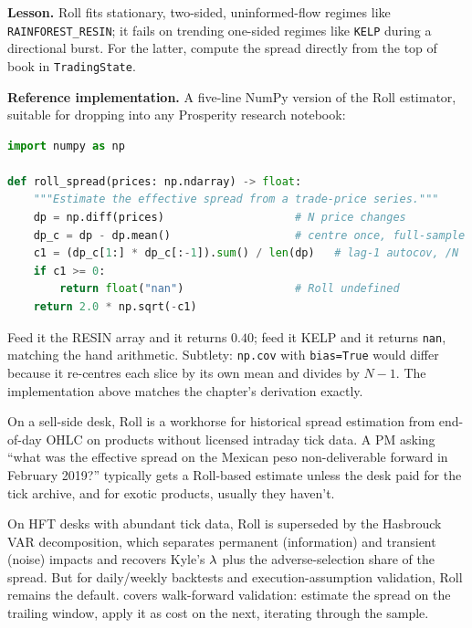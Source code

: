 \begin{prosperitybox}
\medskip
\textbf{Lesson.} Roll fits stationary, two-sided, uninformed-flow
regimes like \texttt{RAINFOREST\_RESIN}; it fails on trending
one-sided regimes like \texttt{KELP} during a directional burst.
For the latter, compute the spread directly from the top of book
in \texttt{TradingState}.

\medskip
\textbf{Reference implementation.} A five-line NumPy version of
the Roll estimator, suitable for dropping into any Prosperity
research notebook:
\begin{lstlisting}[language=Python, caption={Roll spread estimator from trade prices.}]
import numpy as np

def roll_spread(prices: np.ndarray) -> float:
    """Estimate the effective spread from a trade-price series."""
    dp = np.diff(prices)                    # N price changes
    dp_c = dp - dp.mean()                   # centre once, full-sample
    c1 = (dp_c[1:] * dp_c[:-1]).sum() / len(dp)   # lag-1 autocov, /N
    if c1 >= 0:
        return float("nan")                 # Roll undefined
    return 2.0 * np.sqrt(-c1)
\end{lstlisting}
Feed it the RESIN array and it returns $0.40$; feed it KELP and
it returns \texttt{nan}, matching the hand arithmetic. Subtlety:
\texttt{np.cov} with \texttt{bias=True} would differ because it
re-centres each slice by its own mean and divides by $N-1$. The
implementation above matches the chapter's derivation exactly.
\end{prosperitybox}

\begin{gsbox}
On a sell-side desk, Roll is a workhorse for historical spread
estimation from end-of-day OHLC on products without licensed
intraday tick data. A PM asking ``what was the effective spread on
the Mexican peso non-deliverable forward in February 2019?''
typically gets a Roll-based estimate unless the desk paid for the
tick archive, and for exotic products, usually they haven't.

On HFT desks with abundant tick data, Roll is superseded by the
Hasbrouck VAR decomposition, which separates permanent
(information) and transient (noise) impacts and recovers Kyle's
$\lambda$ plus the adverse-selection share of the spread. But for
daily/weekly backtests and execution-assumption validation, Roll
remains the default.  covers walk-forward
validation: estimate the spread on the trailing window, apply it
as cost on the next, iterating through the sample.
\end{gsbox}

